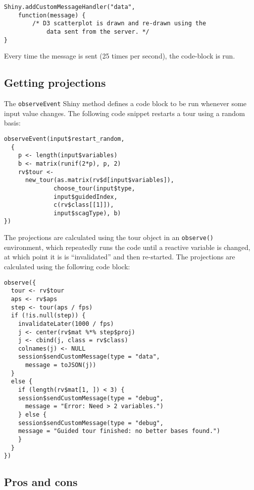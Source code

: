 \begin{verbatim}
Shiny.addCustomMessageHandler("data",
    function(message) {
        /* D3 scatterplot is drawn and re-drawn using the
            data sent from the server. */
}
\end{verbatim}

Every time the message is sent (25 times per second), the code-block is
run.

\subsection{Getting projections}\label{getting-projections}

The \texttt{observeEvent} Shiny method defines a code block to be run
whenever some input value changes. The following code snippet restarts a
tour using a random basis:

\begin{verbatim}
observeEvent(input$restart_random,
  {
    p <- length(input$variables)
    b <- matrix(runif(2*p), p, 2)
    rv$tour <- 
      new_tour(as.matrix(rv$d[input$variables]),
              choose_tour(input$type, 
              input$guidedIndex,
              c(rv$class[[1]]), 
              input$scagType), b)
})
\end{verbatim}

The projections are calculated using the tour object in an
\texttt{observe()} environment, which repeatedly runs the code until a
reactive variable is changed, at which point it is is ``invalidated''
and then re-started. The projections are calculated using the following
code block:

\begin{verbatim}
observe({
  tour <- rv$tour
  aps <- rv$aps
  step <- tour(aps / fps)
  if (!is.null(step)) {
    invalidateLater(1000 / fps)
    j <- center(rv$mat %*% step$proj)
    j <- cbind(j, class = rv$class)
    colnames(j) <- NULL
    session$sendCustomMessage(type = "data", 
      message = toJSON(j))
  }
  else {
    if (length(rv$mat[1, ]) < 3) {
    session$sendCustomMessage(type = "debug", 
      message = "Error: Need > 2 variables.")
    } else {
    session$sendCustomMessage(type = "debug", 
    message = "Guided tour finished: no better bases found.")
    }
  }
})
\end{verbatim}

\subsection{Pros and cons}\label{pros-and-cons}

